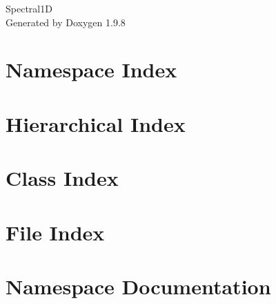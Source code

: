 \documentclass[twoside]{book}
\newcommand{\+}{\discretionary{\mbox{\scriptsize$\hookleftarrow$}}{}{}}
\newcommand{\clearemptydoublepage}{%
    \newpage{\pagestyle{empty}\cleardoublepage}%
  }
\begin{document}
  \raggedbottom
    \hypersetup{pageanchor=false,
                bookmarksnumbered=true,
                pdfencoding=unicode
               }
  \begin{titlepage}
  \vspace*{7cm}
  \begin{center}%
  {\Large Spectral1D}\\
  \vspace*{1cm}
  {\large Generated by Doxygen 1.9.8}\\
  \end{center}
  \end{titlepage}
  \clearemptydoublepage
  \tableofcontents
  \clearemptydoublepage
  \hypersetup{pageanchor=true}



\chapter{Namespace Index}

\chapter{Hierarchical Index}

\chapter{Class Index}

\chapter{File Index}

\chapter{Namespace Documentation}



\end{document}
